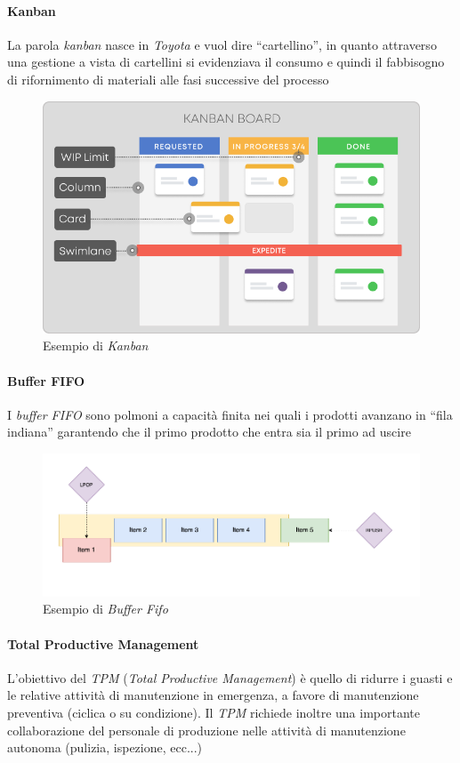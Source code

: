 \paragraph{Kanban}
La parola \textit{kanban} nasce in \textit{Toyota} e vuol dire “cartellino”, in quanto attraverso una gestione a vista di cartellini si evidenziava il consumo e quindi il fabbisogno di rifornimento di materiali alle fasi successive del processo

\begin{figure}[h!]
	\includegraphics[width=0.8\linewidth]{resources/chapters/OrganizzazioneAziendale/images/kanban.png}
	\centering
	\caption{Esempio di \textit{Kanban}}
\end{figure}

\paragraph{Buffer FIFO}
I \textit{buffer FIFO} sono polmoni a capacità finita nei quali i prodotti avanzano in “fila indiana” garantendo che il primo prodotto che entra sia il primo ad uscire

\begin{figure}[h!]
	\includegraphics[width=0.8\linewidth]{resources/chapters/OrganizzazioneAziendale/images/fifo.png}
	\centering
	\caption{Esempio di \textit{Buffer Fifo}}
\end{figure}

\paragraph{Total Productive Management}
L’obiettivo del \textit{TPM} (\textit{Total Productive Management}) è quello di ridurre i guasti e le relative attività di manutenzione in emergenza, a favore di manutenzione preventiva (ciclica o su condizione). Il \textit{TPM} richiede inoltre una importante collaborazione del personale di produzione nelle attività di manutenzione autonoma (pulizia, ispezione, ecc...)

